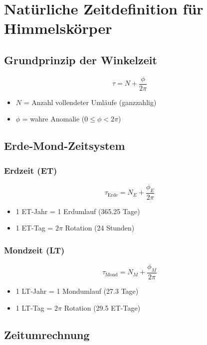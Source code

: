 \section{Natürliche Zeitdefinition für Himmelskörper}

\subsection{Grundprinzip der Winkelzeit}
\begin{equation}
\tau = N + \frac{\phi}{2\pi}
\end{equation}
\begin{itemize}
    \item $N$ = Anzahl vollendeter Umläufe (ganzzahlig)
    \item $\phi$ = wahre Anomalie ($0 \leq \phi < 2\pi$)
\end{itemize}

\subsection{Erde-Mond-Zeitsystem}
\subsubsection{Erdzeit (ET)}
\begin{equation}
\tau_{\text{Erde}} = N_E + \frac{\phi_E}{2\pi}
\end{equation}
\begin{itemize}
    \item 1 ET-Jahr = 1 Erdumlauf (365.25 Tage)
    \item 1 ET-Tag = $2\pi$ Rotation (24 Stunden)
\end{itemize}

\subsubsection{Mondzeit (LT)}
\begin{equation}
\tau_{\text{Mond}} = N_M + \frac{\phi_M}{2\pi}
\end{equation}
\begin{itemize}
    \item 1 LT-Jahr = 1 Mondumlauf (27.3 Tage)
    \item 1 LT-Tag = $2\pi$ Rotation (29.5 ET-Tage)
\end{itemize}

\subsection{Zeitumrechnung}
